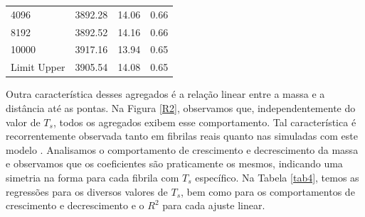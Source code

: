 \documentclass[11pt,a4paper]{article} %
\begin{document}
\begin{table}[H]
\begin{tabular}{lccc}
            4096             & 3892.28                                   & 14.06             & 0.66                  \\
            8192             & 3892.52                                   & 14.16             & 0.66                  \\
            10000            & 3917.16                                   & 13.94             & 0.65                  \\ \hline
            \multicolumn{1}{l}{Limit Upper} & 3905.54                    & 14.08             & 0.65                  \\ \hline
            \end{tabular}
            \label{tab1}  %
        \end{table}
    

        Outra característica desses agregados é a relação linear entre a massa e a distância até as pontas. Na Figura  
        \ref{R2}, observamos que, independentemente do valor de \(T_{s}\), todos os agregados exibem esse comportamento.  
        Tal característica é recorrentemente observada tanto em fibrilas reais quanto nas simuladas com este modelo  
        \cite{Parkinson1995,Kadler1987}. Analisamos o comportamento de crescimento e decrescimento da massa e observamos
        que os coeficientes são praticamente os mesmos, indicando uma simetria na forma para cada fibrila com \(T_{s}\)
        específico. Na Tabela \ref{tab4}, temos as regressões para os diversos valores de \(T_{s}\), bem como para os
        comportamentos de crescimento e decrescimento e o \(R^{2}\) para cada ajuste linear.
\end{document}
